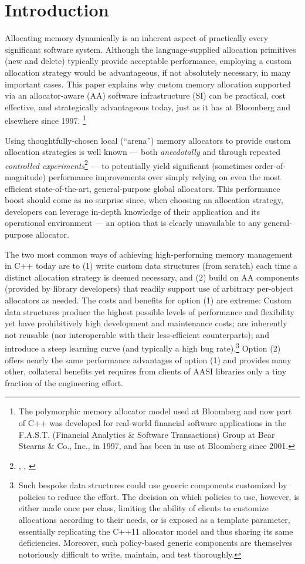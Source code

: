 
\section{Introduction}
Allocating memory dynamically is an inherent aspect of practically every significant
software system. Although the language-supplied allocation primitives (new and
delete) typically provide acceptable performance, employing a custom allocation
strategy would be advantageous, if not absolutely necessary, in many important
cases. This paper explains why custom memory allocation supported via an
allocator-aware (AA) software infrastructure (SI) can be practical, cost effective, and
strategically advantageous today, just as it has at Bloomberg and elsewhere since
1997. \footnote{The polymorphic memory allocator model used at Bloomberg and now part of C++ was developed for
real-world financial software applications in the F.A.S.T. (Financial Analytics \& Software
Transactions) Group at Bear Stearns \& Co., Inc., in 1997, and has been in use at Bloomberg since
2001.}

Using thoughtfully-chosen local (“arena”) memory allocators to provide custom
allocation strategies is well known — both \emph{anecdotally} and through repeated
\emph{controlled experiments}\footnote{\cite{lakos16}, \cite{bleaney16}, \cite{lakos17b}}
— to potentially yield significant (sometimes order-of-magnitude)
performance improvements over simply relying on even the most
efficient state-of-the-art, general-purpose global allocators. This performance boost
should come as no surprise since, when choosing an allocation strategy, developers
can leverage in-depth knowledge of their application and its operational environment
— an option that is clearly unavailable to any general-purpose allocator.

The two most common ways of achieving high-performing memory management in
C++ today are to (1) write custom data structures (from scratch) each time a distinct
allocation strategy is deemed necessary, and (2) build on AA components (provided
by library developers) that readily support use of arbitrary per-object allocators as
needed. The costs and benefits for option (1) are extreme: Custom data structures
produce the highest possible levels of performance and flexibility yet have
prohibitively high development and maintenance costs; are inherently not reusable
(nor interoperable with their less-efficient counterparts); and introduce a steep
learning curve (and typically a high bug rate).\footnote{Such bespoke data structures
could use generic components customized by policies to reduce the
effort. The decision on which policies to use, however, is either made once per class, limiting the
ability of clients to customize allocations according to their needs, or is exposed as a template
parameter, essentially replicating the C++11 allocator model and thus sharing its same deficiencies.
Moreover, such policy-based generic components are themselves notoriously difficult to write,
maintain, and test thoroughly.}
Option (2) offers nearly the same
performance advantages of option (1) and provides many other, collateral benefits
yet requires from clients of AASI libraries only a tiny fraction of the engineering
effort.

